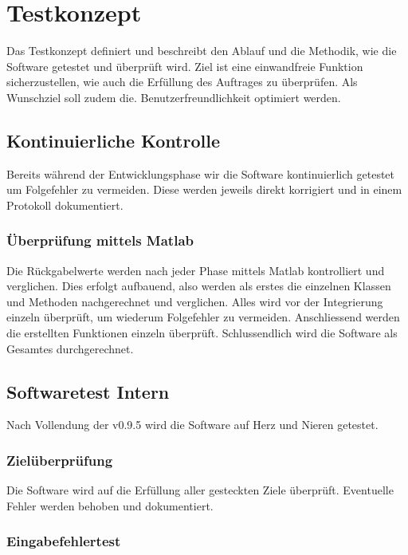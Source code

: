 \section{Testkonzept} \label{sec:Testkonzept}

Das Testkonzept definiert und beschreibt den Ablauf und die Methodik, wie die Software getestet und überprüft wird. Ziel ist eine einwandfreie Funktion sicherzustellen, wie auch die Erfüllung des Auftrages zu überprüfen. Als Wunschziel soll zudem die. Benutzerfreundlichkeit optimiert werden.


\subsection{Kontinuierliche Kontrolle } \label{subsec:1}

Bereits während der Entwicklungsphase wir die Software kontinuierlich getestet um Folgefehler zu vermeiden. Diese werden jeweils direkt korrigiert und in einem Protokoll dokumentiert. 

\subsubsection{Überprüfung mittels Matlab  } \label{subsubsec:1}

Die Rückgabelwerte werden nach jeder Phase mittels Matlab kontrolliert und verglichen.
Dies erfolgt aufbauend, also werden als erstes die einzelnen Klassen und Methoden nachgerechnet und verglichen. Alles wird vor der Integrierung einzeln überprüft, um wiederum Folgefehler zu vermeiden. Anschliessend werden die erstellten Funktionen einzeln überprüft. Schlussendlich wird die Software als Gesamtes durchgerechnet.


\subsection{Softwaretest Intern} \label{subsec:2}

Nach Vollendung der v0.9.5 wird die Software auf Herz und Nieren getestet.

\subsubsection{Zielüberprüfung} \label{subsubsec:1}

Die Software wird auf die Erfüllung aller gesteckten Ziele überprüft. Eventuelle Fehler werden behoben und dokumentiert.

\subsubsection{Eingabefehlertest } \label{subsubsec:2}
 
